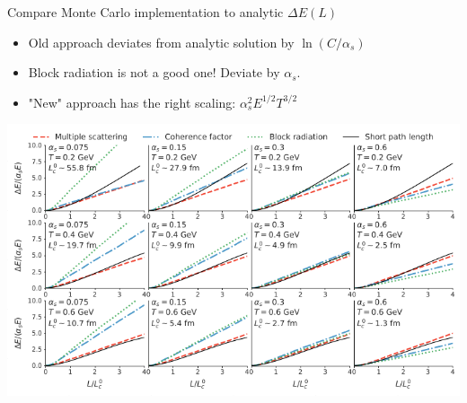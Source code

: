 \documentclass[11pt]{beamer}
\begin{document}
\begin{frame}{Compare Monte Carlo implementation to analytic $\Delta E(L)$}
\begin{itemize}
\item Old approach deviates from analytic solution by $\ln(C/\alpha_s)$
\item Block radiation is not a good one! Deviate by $\alpha_s$.
\item "New" approach has the right scaling: $\alpha_s^2 E^{1/2} T^{3/2}$
\end{itemize}
\begin{center}
\includegraphics[width=.85\textwidth]{Eloss_Ldep.pdf}
\end{center}
\end{frame}
\end{document}
